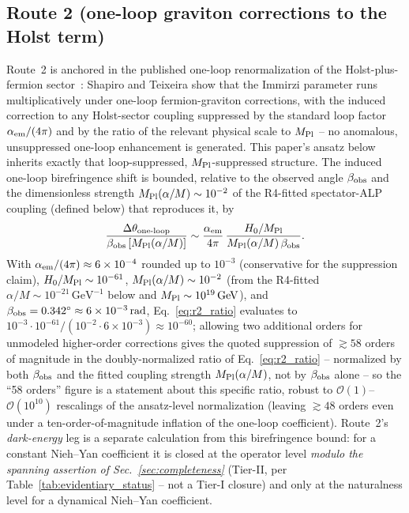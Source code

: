 \documentclass[aps,prd,twocolumn,superscriptaddress,preprintnumbers,nofootinbib,longbibliography,floatfix]{revtex4-2}
\newcommand{\MPl}{M_{\rm Pl}}
\begin{document}
\subsection{Route 2 (one-loop graviton corrections to the Holst term)}
Route~2 is anchored in the published one-loop renormalization of the
Holst-plus-fermion sector~\cite{ShapiroTeixeira2014}: Shapiro and
Teixeira show that the Immirzi parameter runs multiplicatively under
one-loop fermion-graviton corrections, with the induced correction to
any Holst-sector coupling suppressed by the standard loop factor
$\alpha_{\rm em}/(4\pi)$ and by the ratio of the relevant physical scale
to $\MPl$ -- no anomalous, unsuppressed one-loop enhancement is
generated. This paper's ansatz below inherits exactly that
loop-suppressed, $\MPl$-suppressed structure. The induced
one-loop birefringence shift is bounded, relative to the observed angle
$\beta_{\rm obs}$ and the dimensionless strength
$\MPl(\alpha/M)\sim10^{-2}$ of the R4-fitted spectator-ALP coupling
(defined below) that reproduces it, by
\begin{equation}\label{eq:r2_ratio}
\frac{\Delta\theta_{\rm one\text{-}loop}}{\beta_{\rm obs}\,[\MPl(\alpha/M)]}
\sim\frac{\alpha_{\rm em}}{4\pi}\,\frac{H_0/\MPl}{\MPl(\alpha/M)\,\beta_{\rm obs}}.
\end{equation}
With $\alpha_{\rm em}/(4\pi)\approx6\times10^{-4}$ rounded up to
$10^{-3}$ (conservative for the suppression claim), $H_0/\MPl\sim
10^{-61}$, $\MPl(\alpha/M)\sim10^{-2}$ (from the R4-fitted
$\alpha/M\sim10^{-21}\,\mathrm{GeV}^{-1}$ below and
$\MPl\sim10^{19}\,\mathrm{GeV}$), and
$\beta_{\rm obs}=0.342^\circ\approx6\times10^{-3}\,\mathrm{rad}$,
Eq.~\eqref{eq:r2_ratio} evaluates to
$10^{-3}\cdot10^{-61}/(10^{-2}\cdot6\times10^{-3})\approx10^{-60}$;
allowing two additional orders for unmodeled higher-order corrections
gives the quoted suppression of ${\gtrsim}58$ orders of magnitude in the
doubly-normalized ratio of Eq.~\eqref{eq:r2_ratio} -- normalized by both
$\beta_{\rm obs}$ and the fitted coupling strength $\MPl(\alpha/M)$, not
by $\beta_{\rm obs}$ alone -- so the ``58 orders'' figure is a statement
about this specific ratio, robust to
$\mathcal O(1)$--$\mathcal O(10^{10})$ rescalings of the ansatz-level
normalization (leaving ${\gtrsim}48$ orders even under a
ten-order-of-magnitude inflation of the one-loop coefficient). Route~2's
\emph{dark-energy} leg is a separate calculation from this birefringence
bound: for a constant Nieh--Yan coefficient it is closed at the operator
level \emph{modulo the spanning assertion of Sec.~\ref{sec:completeness}}
(Tier-II, per Table~\ref{tab:evidentiary_status} -- not a Tier-I closure)
and only at the naturalness level for a dynamical Nieh--Yan coefficient.
\end{document}
